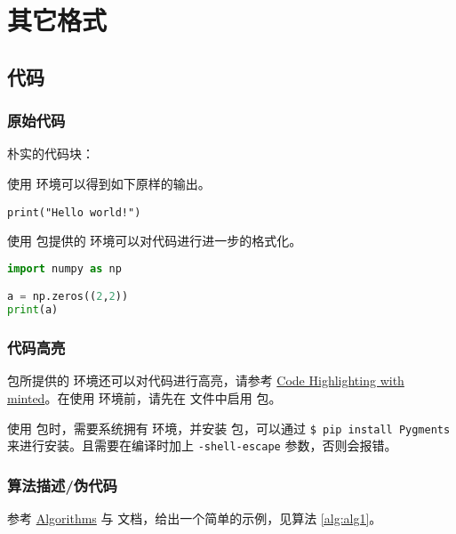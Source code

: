 
\chapter{其它格式}
\section{代码}
\subsection{原始代码}
朴实的代码块：

使用  环境可以得到如下原样的输出。
\begin{verbatim}
print("Hello world!")
\end{verbatim}

使用  包提供的  环境可以对代码进行进一步的格式化。
\begin{lstlisting}[language=Python,frame=single]
import numpy as np

a = np.zeros((2,2))
print(a)
\end{lstlisting}

\subsection{代码高亮}
 包所提供的  环境还可以对代码进行高亮，请参考 \href{https://www.overleaf.com/learn/latex/Code_Highlighting_with_minted}{Code Highlighting with minted}。在使用  环境前，请先在  文件中启用  包。

\begin{notice}
  使用  包时，需要系统拥有  环境，并安装  包，可以通过 \verb|$ pip install Pygments| 来进行安装。且需要在编译时加上 \verb|-shell-escape| 参数，否则会报错。
\end{notice}



\subsection{算法描述/伪代码}
参考 \href{https://en.wikibooks.org/wiki/LaTeX/Algorithms}{Algorithms} 与  文档，给出一个简单的示例，见算法 \ref{alg:alg1}。

